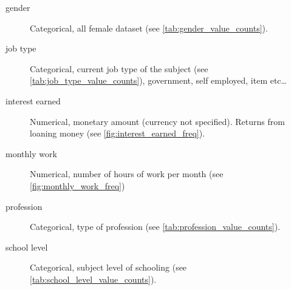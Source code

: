 \begin{description}
\item [gender] Categorical, all female dataset
    (see \vref{tab:gender_value_counts}).

\item [job type] Categorical, current job type of the subject
    (see \vref{tab:job_type_value_counts}), government, self employed,
    item etc\ldots

\item [interest earned] Numerical, monetary amount (currency not specified).
    Returns from loaning money (see \vref{fig:interest_earned_freq}).

\item [monthly work] Numerical, number of hours of work per month
    (see \vref{fig:monthly_work_freq})

\item [profession] Categorical, type of profession
    (see \vref{tab:profession_value_counts}).

\item [school level] Categorical, subject level of schooling
    (see \vref{tab:school_level_value_counts}).

\end{description}

